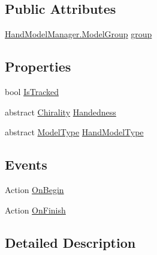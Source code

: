 \subsection*{Public Attributes}
\begin{DoxyCompactItemize}
\item 
\mbox{\hyperlink{class_leap_1_1_unity_1_1_hand_model_manager_1_1_model_group}{Hand\+Model\+Manager.\+Model\+Group}} \mbox{\hyperlink{class_leap_1_1_unity_1_1_hand_model_base_a3b68edab1954372052ab9031786dfcfa}{group}}
\end{DoxyCompactItemize}
\subsection*{Properties}
\begin{DoxyCompactItemize}
\item 
bool \mbox{\hyperlink{class_leap_1_1_unity_1_1_hand_model_base_a31704b6829e3d442133350b34a4a5a8a}{Is\+Tracked}}
\item 
abstract \mbox{\hyperlink{namespace_leap_1_1_unity_a4d15adcf20ba121b2cd9c07f503b606f}{Chirality}} \mbox{\hyperlink{class_leap_1_1_unity_1_1_hand_model_base_a9500f0cd89372ac06d0e6879e26bb3c5}{Handedness}}
\item 
abstract \mbox{\hyperlink{namespace_leap_1_1_unity_a186e5eb0a2b743f1f6b79346f0ab8ad0}{Model\+Type}} \mbox{\hyperlink{class_leap_1_1_unity_1_1_hand_model_base_a14f5f440353325c6a4a531d9110d0ff2}{Hand\+Model\+Type}}
\end{DoxyCompactItemize}
\subsection*{Events}
\begin{DoxyCompactItemize}
\item 
Action \mbox{\hyperlink{class_leap_1_1_unity_1_1_hand_model_base_a9dc33aeca6f54cdb24efe3798f8274d4}{On\+Begin}}
\item 
Action \mbox{\hyperlink{class_leap_1_1_unity_1_1_hand_model_base_ac5252ddb5ef8a9e78aa01135d832ede0}{On\+Finish}}
\end{DoxyCompactItemize}


\subsection{Detailed Description}


